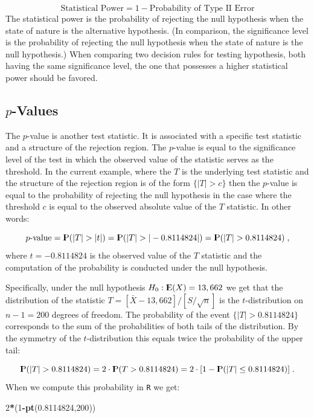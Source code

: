 \documentclass[]{krantz}
\makeatletter
\newenvironment{Shaded}{\begin{snugshade}}{\end{snugshade}}
\newcommand{\DecValTok}[1]{\textcolor[rgb]{0.00,0.00,0.81}{#1}}
\newcommand{\FloatTok}[1]{\textcolor[rgb]{0.00,0.00,0.81}{#1}}
\newcommand{\KeywordTok}[1]{\textcolor[rgb]{0.13,0.29,0.53}{\textbf{#1}}}
\newcommand{\NormalTok}[1]{#1}
\newcommand{\OperatorTok}[1]{\textcolor[rgb]{0.81,0.36,0.00}{\textbf{#1}}}
\newcommand{\Expec}{{\rm I\kern-.3em E}}
\newcommand{\Prob}{{\rm I\kern-.3em P}}
\newenvironment{kframe}{%
\medskip{}
\setlength{\fboxsep}{.8em}
 \def\at@end@of@kframe{}%
 \ifinner\ifhmode%
  \def\at@end@of@kframe{\end{minipage}}%
  \begin{minipage}{\columnwidth}%
 \fi\fi%
 \def\FrameCommand##1{\hskip\@totalleftmargin \hskip-\fboxsep
 \colorbox{shadecolor}{##1}\hskip-\fboxsep
     \hskip-\linewidth \hskip-\@totalleftmargin \hskip\columnwidth}%
 \MakeFramed {\advance\hsize-\width
   \@totalleftmargin\z@ \linewidth\hsize
   \@setminipage}}%
 {\par\unskip\endMakeFramed%
 \at@end@of@kframe}
\renewenvironment{Shaded}{\begin{kframe}}{\end{kframe}}
\theoremstyle{definition}
\theoremstyle{definition}
\theoremstyle{definition}
\theoremstyle{remark}
\makeatother
\begin{document}
\[\mbox{Statistical Power} = 1 - \mbox{Probability of Type II Error}\]
The statistical power is the probability of rejecting the null
hypothesis when the state of nature is the alternative hypothesis. (In
comparison, the significance level is the probability of rejecting the
null hypothesis when the state of nature is the null hypothesis.) When
comparing two decision rules for testing hypothesis, both having the
same significance level, the one that possesses a higher statistical
power should be favored.

\hypertarget{p-values}{%
\subsection{\texorpdfstring{\(p\)-Values}{p-Values}}\label{p-values}}

The \(p\)-value is another test statistic. It is associated with a
specific test statistic and a structure of the rejection region. The
\(p\)-value is equal to the significance level of the test in which the
observed value of the statistic serves as the threshold. In the current
example, where the \(T\) is the underlying test statistic and the
structure of the rejection region is of the form \(\{|T| > c\}\) then the
\(p\)-value is equal to the probability of rejecting the null hypothesis
in the case where the threshold \(c\) is equal to the observed absolute
value of the \(T\) statistic. In other words:

\[\mbox{$p$-value} = \Prob(|T| > |t|) = \Prob(|T| > |-0.8114824|)= \Prob(|T| > 0.8114824)\;,\]
where \(t=-0.8114824\) is the observed value of the \(T\) statistic and the
computation of the probability is conducted under the null hypothesis.

Specifically, under the null hypothesis \(H_0: \Expec(X) = 13,662\) we get
that the distribution of the statistic
\(T = [\bar X - 13,662]/[S/\sqrt{n}]\) is the \(t\)-distribution on
\(n-1 = 200\) degrees of freedom. The probability of the event
\(\{|T| > 0.8114824\}\) corresponds to the sum of the probabilities of
both tails of the distribution. By the symmetry of the \(t\)-distribution
this equals twice the probability of the upper tail:

\[\Prob(|T| > 0.8114824) = 2\cdot \Prob(T> 0.8114824) = 2\cdot [1-\Prob(|T| \leq 0.8114824)]\;.\]
When we compute this probability in \texttt{R} we get:

\begin{Shaded}
\begin{Highlighting}[]
\DecValTok{2}\OperatorTok{*}\NormalTok{(}\DecValTok{1}\OperatorTok{-}\KeywordTok{pt}\NormalTok{(}\FloatTok{0.8114824}\NormalTok{,}\DecValTok{200}\NormalTok{))}
\end{Highlighting}
\end{Shaded}
\end{document}
